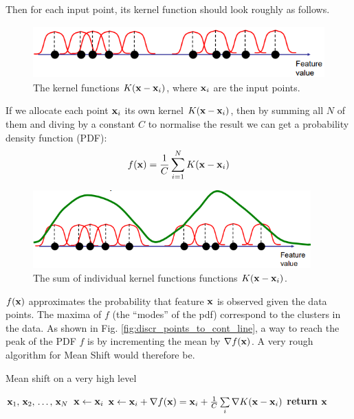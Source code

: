 \documentclass[a4paper]{article}
\begin{document}
Then for each input point, its kernel function should look roughly as follows.
\begin{figure}[H]
    \centering
    \includegraphics[height=2.0cm]{img/mean_shift/black_points_kernel_functions.PNG}
    \caption{The kernel functions $K(\textbf{x} - \textbf{x}_i)$, where $\textbf{x}_i$ are the input points.}
    \label{fig:my_label}
\end{figure}
If we allocate each point $\textbf{x}_i$ its own kernel $K(\textbf{x} - \textbf{x}_i)$, then by summing all $N$ of them and diving by a constant $C$ to normalise the result we can get a probability density function (PDF):
\begin{equation}
  f(\textbf{x}) = \frac{1}{C}\sum \limits _{i=1} ^{N} {K(\textbf{x} - \textbf{x}_i)}   
\end{equation}
\begin{figure}[H]
    \centering
    \includegraphics[height=3cm]{img/mean_shift/black_points_pdf.PNG}
    \caption{The sum of individual kernel functions functions $K(\textbf{x} - \textbf{x}_i)$.}
\end{figure}
$f(\textbf{x})$ approximates the probability that feature $\textbf{x}$ is observed given the data points. The maxima of $f$ (the ``modes'' of the pdf) correspond to the clusters in the data. As shown in Fig. \ref{fig:discr_points_to_cont_line}, a way to reach the peak of the PDF $f$ is by incrementing the mean by $\nabla f(\textbf{x})$. A very rough algorithm for Mean Shift would therefore be.

\begin{algorithm}[H]
\caption{Mean shift on a very high level}
\label{alg:first_draft_mean_shift}
\begin{algorithmic}[1]
 {$\textbf{x}_1,\, \textbf{x}_2, \, \ldots, \, \textbf{x}_N$} 
\State $\textbf{x} \leftarrow \textbf{x}_i$
 
\State $\textbf{x} \leftarrow \textbf{x}_i + \nabla f(\textbf{x}) = \textbf{x}_i + \frac{1}{C}\sum \limits_{i}{\nabla K(\textbf{x} - \textbf{x}_i)}$
\EndWhile
\EndFor
\State \textbf{return} $\textbf{x}$
\EndProcedure
\end{algorithmic}
\end{algorithm}
\end{document}
